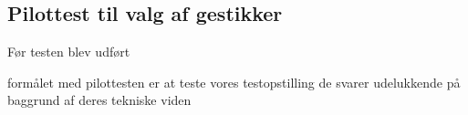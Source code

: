 \subsection{Pilottest til valg af gestikker}
\label{PilottestValgAfGestikker}
Før testen blev udført

formålet med pilottesten er at teste vores testopstilling
de svarer udelukkende på baggrund af deres tekniske viden